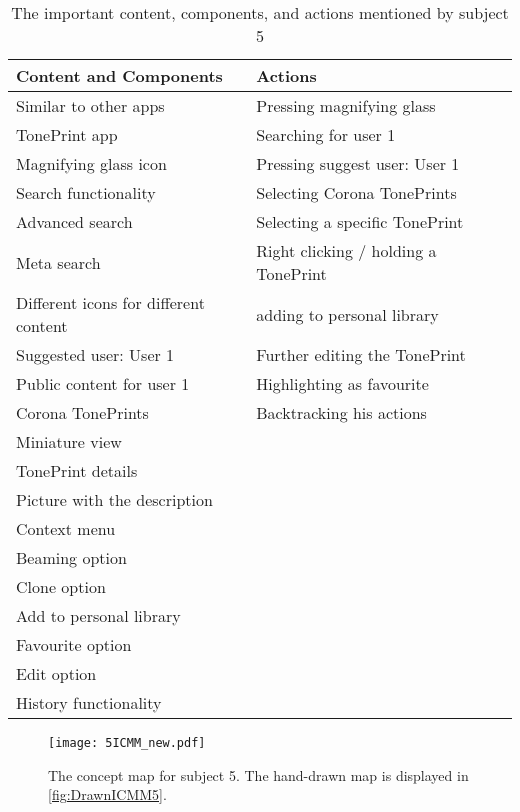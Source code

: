 \begin{table}[H]
\begin{minipage}[b]{\linewidth}\centering
	\begin{tabular} {|l|l|l|} \hline
		\rowcolor{xGray25} \textbf{Content and Components} & \textbf{Actions} \\  \hline
		Similar to other apps & Pressing magnifying glass \\
		TonePrint app & Searching for user 1 \\
		Magnifying glass icon & Pressing suggest user: User 1 \\
		Search functionality & Selecting Corona TonePrints \\
		Advanced search & Selecting a specific TonePrint \\
		Meta search & Right clicking / holding a TonePrint \\
		Different icons for different content & adding to personal library \\
		Suggested user: User 1 & Further editing the TonePrint \\
		Public content for user 1 & Highlighting as favourite \\
		Corona TonePrints & Backtracking his actions \\
		Miniature view &  \\
		TonePrint details & \\
		Picture with the description & \\
		Context menu & \\
		Beaming option & \\
		Clone option & \\
		Add to personal library & \\
		Favourite option & \\
		Edit option & \\
		History functionality & \\ \hline
	\end{tabular}
	\caption{The important content, components, and actions mentioned by subject 5}
	\label{tab:Subject5ContentActions}
\end{minipage}
\end{table}
%
\begin{figure}[H]
	\centering
	\texttt{[image: 5ICMM\_new.pdf]}
	\caption{The concept map for subject 5. The hand-drawn map is displayed in \autoref{fig:DrawnICMM5}.}
	\label{fig:ICMM5}
\end{figure}
%
\newpage




